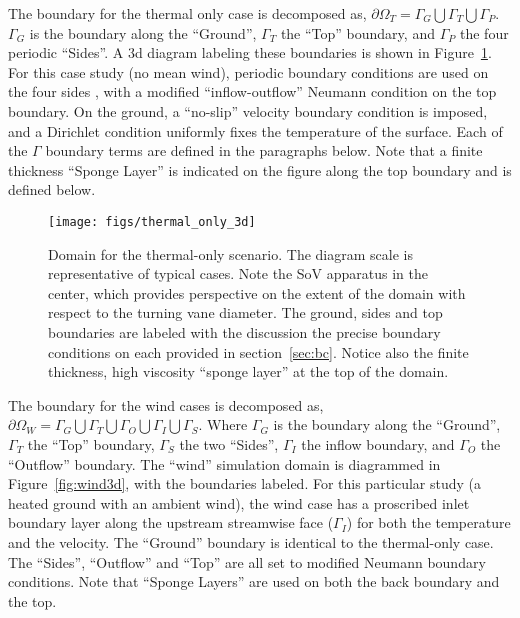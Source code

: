 The boundary for the thermal only case is decomposed as,
$\partial \Omega_T = \Gamma_G \bigcup \Gamma_T \bigcup \Gamma_P $. 
$\Gamma_G$ is the boundary along the ``Ground'', $\Gamma_T$
the ``Top'' boundary, and $\Gamma_P$ the four periodic ``Sides''. A 3d
diagram labeling these boundaries is shown in
Figure~\ref{fig:thermal3d}. For this case study (no mean wind),
periodic boundary conditions are used on the four sides , with a modified 
``inflow-outflow'' Neumann condition\cite{gunzburger1989finite} on the
top boundary. On the ground, a ``no-slip'' velocity boundary condition is
imposed, and a Dirichlet condition uniformly fixes
the temperature of the surface. 
Each of the $\Gamma$ boundary terms are defined in the paragraphs below. 
Note that a finite thickness ``Sponge Layer'' is
indicated on the figure along the top boundary and is defined below. 

\begin{figure}[!htb]
  \begin{center}
    \texttt{[image: figs/thermal\_only\_3d]}
    \caption{Domain for the thermal-only
   scenario. The diagram scale is representative of typical cases. Note
   the SoV apparatus in the center, which provides perspective on the
   extent of the domain with respect to the turning vane diameter. The
   ground, sides and top boundaries are labeled with the discussion the
   precise boundary conditions on each provided in
   section~\ref{sec:bc}. Notice also the finite thickness, high
   viscosity ``sponge layer'' at the top of the domain.} 
    \label{fig:thermal3d}
  \end{center}
\end{figure}

The boundary for the wind cases is decomposed as,
$\partial \Omega_W = \Gamma_G \bigcup \Gamma_T \bigcup \Gamma_O \bigcup
\Gamma_I \bigcup \Gamma_S $.  
Where $\Gamma_G$ is the boundary along the ``Ground'',
$\Gamma_T$ the ``Top'' boundary, $\Gamma_S$ the two ``Sides'',
$\Gamma_I$ the inflow boundary, and $\Gamma_O$ the ``Outflow''  
boundary.
The ``wind'' simulation domain is diagrammed in
Figure~\ref{fig:wind3d}, with the boundaries labeled. 
For this particular study (a heated ground with 
an ambient wind), the wind case has a proscribed inlet boundary layer
along the upstream streamwise face ($\Gamma_I$) for both the temperature
and the velocity. The ``Ground'' boundary is identical to
the thermal-only case. The ``Sides'', ``Outflow'' and ``Top'' are all
set to modified Neumann boundary conditions. Note that ``Sponge Layers''
are used on both the back boundary and the top. 

